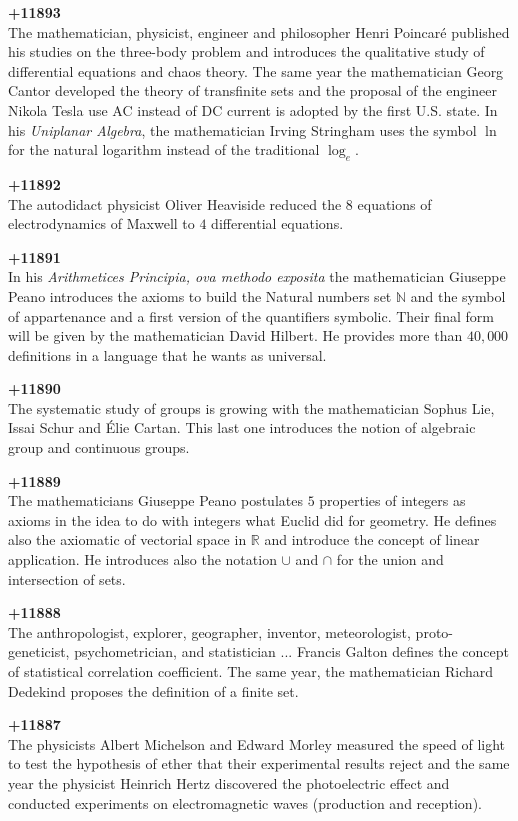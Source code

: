 \textbf{+11893}\\
The mathematician, physicist, engineer and philosopher Henri Poincaré published his studies on the three-body problem and introduces the qualitative study of differential equations and chaos theory. The same year the mathematician Georg Cantor developed the theory of transfinite sets and the proposal of the engineer Nikola Tesla use AC instead of DC current is adopted by the first U.S. state. In his \textit{Uniplanar Algebra}, the mathematician Irving Stringham uses the symbol $\ln$ for the natural logarithm instead of the traditional $\log_e$.

\textbf{+11892}\\
The autodidact physicist Oliver Heaviside reduced the 8 equations of electrodynamics of Maxwell to $4$ differential equations. 

\textbf{+11891}\\
In his \textit{Arithmetices Principia, ova methodo exposita} the mathematician Giuseppe Peano introduces the axioms to build the Natural numbers set $\mathbb{N}$ and the symbol of appartenance and a first version of the quantifiers symbolic. Their final form will be given by the mathematician David Hilbert. He provides more than $40,000$ definitions in a language that he wants as universal.

\textbf{+11890}\\
The systematic study of groups is growing with the mathematician Sophus Lie, Issai Schur and Élie Cartan. This last one introduces the notion of algebraic group and continuous groups. 

\textbf{+11889}\\
The mathematicians Giuseppe Peano postulates $5$ properties of integers as axioms in the idea to do with integers what Euclid did for geometry. He defines also the axiomatic of vectorial space in $\mathbb{R}$ and introduce the concept of linear application. He introduces also the notation $\cup$ and $\cap$ for the union and intersection of sets.

\textbf{+11888}\\
The anthropologist, explorer, geographer, inventor, meteorologist, proto-geneticist, psychometrician, and statistician ... Francis Galton defines the concept of statistical correlation coefficient. The same year, the mathematician Richard Dedekind proposes the definition of a finite set. 

\textbf{+11887}\\
The physicists Albert Michelson and Edward Morley measured the speed of light to test the hypothesis of ether that their experimental results reject and the same year the physicist Heinrich Hertz discovered the photoelectric effect and conducted experiments on electromagnetic waves (production and reception).

